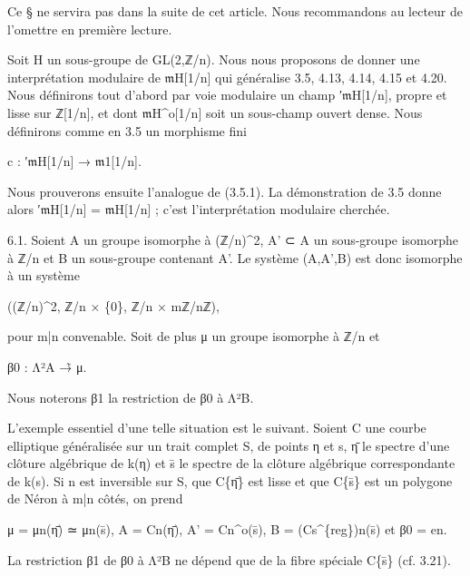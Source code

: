 \documentclass[11pt,a4paper]{article}
\begin{document}
Ce § ne servira pas dans la suite de cet article. Nous recommandons au lecteur de l'omettre en première lecture.

Soit H un sous-groupe de GL(2,ℤ/n). Nous nous proposons de donner une interprétation modulaire de \ensuremath{\mathfrak{m}}\textunderscore{}H[1/n] qui généralise 3.5, 4.13, 4.14, 4.15 et 4.20. Nous définirons tout d'abord par voie modulaire un champ ′\ensuremath{\mathfrak{m}}\textunderscore{}H[1/n], propre et lisse sur ℤ[1/n], et dont \ensuremath{\mathfrak{m}}\textunderscore{}H\textasciicircum{}o[1/n] soit un sous-champ ouvert dense. Nous définirons comme en 3.5 un morphisme fini

c : ′\ensuremath{\mathfrak{m}}\textunderscore{}H[1/n] → \ensuremath{\mathfrak{m}}\textunderscore{}1[1/n].

Nous prouverons ensuite l'analogue de (3.5.1). La démonstration de 3.5 donne alors ′\ensuremath{\mathfrak{m}}\textunderscore{}H[1/n] = \ensuremath{\mathfrak{m}}\textunderscore{}H[1/n] ; c'est l'interprétation modulaire cherchée.

6.1. Soient A un groupe isomorphe à (ℤ/n)\textasciicircum{}2, A' ⊂ A un sous-groupe isomorphe à ℤ/n et B un sous-groupe contenant A'. Le système (A,A',B) est donc isomorphe à un système

((ℤ/n)\textasciicircum{}2, ℤ/n × \{0\}, ℤ/n × mℤ/nℤ),

pour m|n convenable. Soit de plus μ un groupe isomorphe à ℤ/n et

β\textunderscore{}0 : Λ²A →̃ μ.

Nous noterons β\textunderscore{}1 la restriction de β\textunderscore{}0 à Λ²B.

L'exemple essentiel d'une telle situation est le suivant. Soient C une courbe elliptique généralisée sur un trait complet S, de points η et s, η̄ le spectre d'une clôture algébrique de k(η) et s̄ le spectre de la clôture algébrique correspondante de k(s). Si n est inversible sur S, que C\textunderscore{}\{η̄\} est lisse et que C\textunderscore{}\{s̄\} est un polygone de Néron à m|n côtés, on prend

μ = μ\textunderscore{}n(η̄) ≃ μ\textunderscore{}n(s̄),   A = C\textunderscore{}n(η̄),   A' = C\textunderscore{}n\textasciicircum{}o(s̄), B = (C\textunderscore{}s\textasciicircum{}\{reg\})\textunderscore{}n(s̄)   et   β\textunderscore{}0 = e\textunderscore{}n.

La restriction β\textunderscore{}1 de β\textunderscore{}0 à Λ²B ne dépend que de la fibre spéciale C\textunderscore{}\{s̄\} (cf. 3.21).
\end{document}
